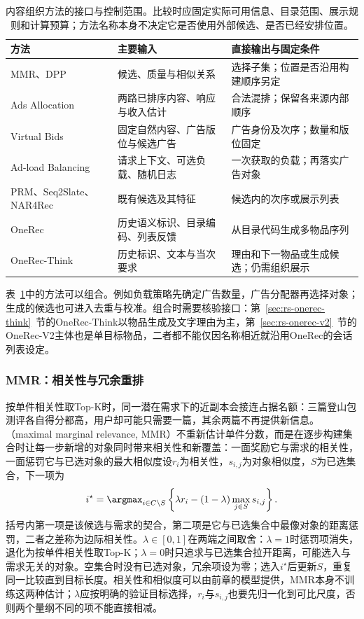\begin{table}[htbp]
 \centering\small
 \begin{tabularx}{\linewidth}{@{}p{28mm}XX@{}}
  \toprule
  方法 & 主要输入 & 直接输出与固定条件\\
  \midrule
  MMR、DPP & 候选、质量与相似关系 & 选择子集；位置是否沿用构建顺序另定\\
  Ads Allocation & 两路已排序内容、响应与收入估计 & 合法混排；保留各来源内部顺序\\
  Virtual Bids & 固定自然内容、广告版位与候选广告 & 广告身份及次序；数量和版位固定\\
  Ad-load Balancing & 请求上下文、可选负载、随机日志 & 一次获取的负载；再落实广告对象\\
  PRM、Seq2Slate、NAR4Rec & 既有候选及其特征 & 候选内的次序或展示列表\\
  OneRec & 历史语义标识、目录编码、列表反馈 & 从目录代码生成多物品序列\\
  OneRec-Think & 历史标识、文本与当次要求 & 理由和下一物品或生成候选；仍需组织展示\\
  \bottomrule
 \end{tabularx}
 \caption{内容组织方法的接口与控制范围。比较时应固定实际可用信息、目录范围、展示规则和计算预算；方法名称本身不决定它是否使用外部候选、是否已经安排位置。}
 \label{tab:rs-content-interfaces}
\end{table}

表~\ref{tab:rs-content-interfaces}中的方法可以组合。例如负载策略先确定广告数量，广告分配器再选择对象；生成的候选也可进入去重与校准。组合时需要核验接口：第~\ref{sec:rs-onerec-think}~节的OneRec-Think以物品生成及文字理由为主，第~\ref{sec:rs-onerec-v2}~节的OneRec-V2主体也是单目标物品，二者都不能仅因名称相近就沿用OneRec的会话列表设定。

\subsubsection{MMR：相关性与冗余重排}
\label{sec:rs-mmr}

按单件相关性取Top-K时，同一潜在需求下的近副本会接连占据名额：三篇登山包测评各自得分都高，用户却可能只需要一篇，其余两篇不再提供新信息。（maximal marginal relevance, MMR）不重新估计单件分数，而是在逐步构建集合时让每一步新增的对象同时带来相关性和新覆盖：一面奖励它与需求的相关性，一面惩罚它与已选对象的最大相似度设$r_i$为相关性，$s_{i,j}$为对象相似度，$S$为已选集合，下一项为
\begin{equation}
 i^\star=\argmax_{i\in C\setminus S}
 \left\{\lambda r_i-(1-\lambda)\max_{j\in S}s_{i,j}\right\}.
 \label{eq:rs-mmr}
\end{equation}
括号内第一项是该候选与需求的契合，第二项是它与已选集合中最像对象的距离惩罚，二者之差称为边际相关性。$\lambda\in[0,1]$在两端之间取舍：$\lambda=1$时惩罚项消失，退化为按单件相关性取Top-K；$\lambda=0$时只追求与已选集合拉开距离，可能选入与需求无关的对象。空集合时没有已选对象，冗余项设为零；选入$i^\star$后更新$S$，重复同一比较直到目标长度。相关性和相似度可以由前章的模型提供，MMR本身不训练这两种估计；$\lambda$应按明确的验证目标选择，$r_i$与$s_{i,j}$也要先归一化到可比尺度，否则两个量纲不同的项不能直接相减。

